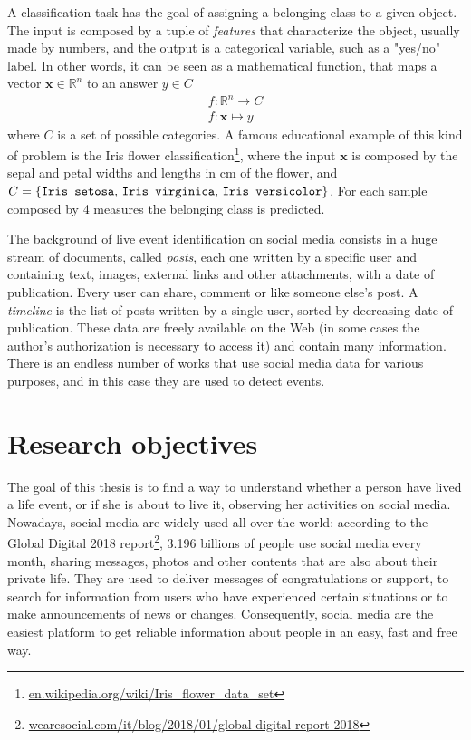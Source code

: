 A classification task has the goal of assigning a belonging class to a given object. The input is composed by a tuple of \emph{features} that characterize the object, usually made by numbers, and the output is a categorical variable, such as a "yes/no" label. In other words, it can be seen as a mathematical function, that maps a vector $ \boldsymbol{x} \in \mathbb{R}^n $ to an answer $ y \in C $
\begin{gather*}
f \colon \mathbb{R}^n \to C \\
f \colon \boldsymbol{x} \mapsto y
\end{gather*}
where $C$ is a set of possible categories. A famous educational example of this kind of problem is the Iris flower classification\footnote{\url{en.wikipedia.org/wiki/Iris_flower_data_set}}, where the input $ \boldsymbol{x} $ is composed by the sepal and petal widths and lengths in cm of the flower, and $C = \{\text{\texttt{Iris setosa}, \texttt{Iris virginica}, \texttt{Iris versicolor}}\}$. For each sample composed by 4 measures the belonging class is predicted.

The background of live event identification on social media consists in a huge stream of documents, called \emph{posts}, each one written by a specific user and containing text, images, external links and other attachments, with a date of publication. Every user can share, comment or like someone else's post. A \emph{timeline} is the list of posts written by a single user, sorted by decreasing date of publication. These data are freely available on the Web (in some cases the author's authorization is necessary to access it) and contain many information. There is an endless number of works that use social media data for various purposes, and in this case they are used to detect events.

\section{Research objectives}

The goal of this thesis is to find a way to understand whether a person have lived a life event, or if she is about to live it, observing her activities on social media. Nowadays, social media are widely used all over the world: according to the Global Digital 2018 report\footnote{\url{wearesocial.com/it/blog/2018/01/global-digital-report-2018}}, 3.196 billions of people use social media every month, sharing messages, photos and other contents that are also about their private life. They are used to deliver messages of congratulations or support, to search for information from users who have experienced certain situations or to make announcements of news or changes. Consequently, social media are the easiest platform to get reliable information about people in an easy, fast and free way.

